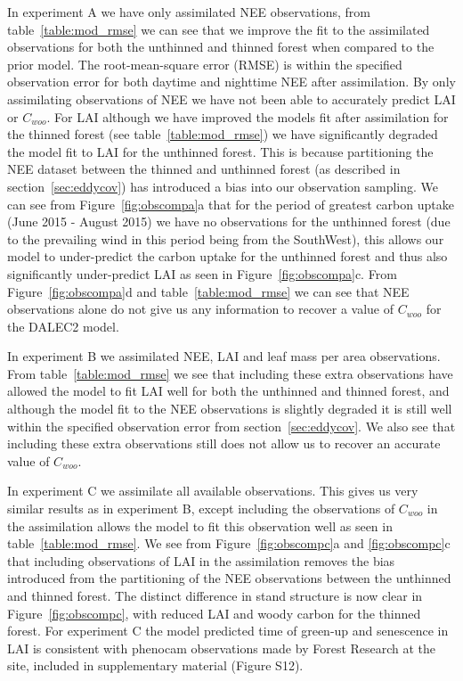 \documentclass[draft,linenumbers]{agujournal}
\begin{document}
In experiment A we have only assimilated NEE observations, from table~\ref{table:mod_rmse} we can see that we improve the fit to the assimilated observations for both the unthinned and thinned forest when compared to the prior model. The root-mean-square error (RMSE) is within the specified observation error for both daytime and nighttime NEE after assimilation. By only assimilating observations of NEE we have not been able to accurately predict LAI or \(C_{woo}\). For LAI although we have improved the models fit after assimilation for the thinned forest (see table~\ref{table:mod_rmse}) we have significantly degraded the model fit to LAI for the unthinned forest. This is because partitioning the NEE dataset between the thinned and unthinned forest (as described in section~\ref{sec:eddycov}) has introduced a bias into our observation sampling. We can see from Figure~\ref{fig:obscompa}a that for the period of greatest carbon uptake (June 2015 - August 2015) we have no observations for the unthinned forest (due to the prevailing wind in this period being from the SouthWest), this allows our model to under-predict the carbon uptake for the unthinned forest and thus also significantly under-predict LAI as seen in Figure~\ref{fig:obscompa}c. From Figure~\ref{fig:obscompa}d and table~\ref{table:mod_rmse} we can see that NEE observations alone do not give us any information to recover a value of \(C_{woo}\) for the DALEC2 model.

In experiment B we assimilated NEE, LAI and leaf mass per area observations. From table~\ref{table:mod_rmse} we see that including these extra observations have allowed the model to fit LAI well for both the unthinned and thinned forest, and although the model fit to the NEE observations is slightly degraded it is still well within the specified observation error from section~\ref{sec:eddycov}. We also see that including these extra observations still does not allow us to recover an accurate value of \(C_{woo}\).      

In experiment C we assimilate all available observations. This gives us very similar results as in experiment B, except including the observations of \(C_{woo}\) in the assimilation allows the model to fit this observation well as seen in table~\ref{table:mod_rmse}. We see from Figure~\ref{fig:obscompc}a and \ref{fig:obscompc}c that including observations of LAI in the assimilation removes the bias introduced from the partitioning of the NEE observations between the unthinned and thinned forest. The distinct difference in stand structure is now clear in Figure~\ref{fig:obscompc}, with reduced LAI and woody carbon for the thinned forest. For experiment C the model predicted time of green-up and senescence in LAI is consistent with phenocam observations made by Forest Research at the site, included in supplementary material (Figure S12).   
\end{document}
